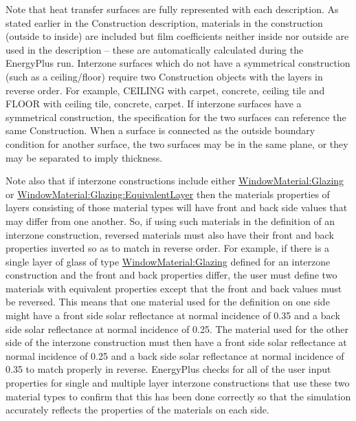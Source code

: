 \begin{callout}
Note that heat transfer surfaces are fully represented with each description. As stated earlier in the Construction description, materials in the construction (outside to inside) are included but film coefficients neither inside nor outside are used in the description -- these are automatically calculated during the EnergyPlus run. Interzone surfaces which do not have a symmetrical construction (such as a ceiling/floor) require two Construction objects with the layers in reverse order. For example, CEILING with carpet, concrete, ceiling tile and FLOOR with ceiling tile, concrete, carpet. If interzone surfaces have a symmetrical construction, the specification for the two surfaces can reference the same Construction. When a surface is connected as the outside boundary condition for another surface, the two surfaces may be in the same plane, or they may be separated to imply thickness.
\end{callout}

\begin{callout}
Note also that if interzone constructions include either \hyperref[windowmaterialglazing]{WindowMaterial:Glazing} or \hyperref[windowmaterialglazingequivalentlayer]{WindowMaterial:Glazing:EquivalentLayer} then the materials properties of layers consisting of those material types will have front and back side values that may differ from one another.  So, if using such materials in the definition of an interzone construction, reversed materials must also have their front and back properties inverted so as to match in reverse order.  For example, if there is a single layer of glass of type \hyperref[windowmaterialglazing]{WindowMaterial:Glazing} defined for an interzone construction and the front and back properties differ, the user must define two materials with equivalent properties except that the front and back values must be reversed.  This means that one material used for the definition on one side might have a front side solar reflectance at normal incidence of 0.35 and a back side solar reflectance at normal incidence of 0.25.  The material used for the other side of the interzone construction must then have a front side solar reflectance at normal incidence of 0.25 and a back side solar reflectance at normal incidence of 0.35 to match properly in reverse.  EnergyPlus checks for all of the user input properties for single and multiple layer interzone constructions that use these two material types to confirm that this has been done correctly so that the simulation accurately reflects the properties of the materials on each side.
\end{callout}

